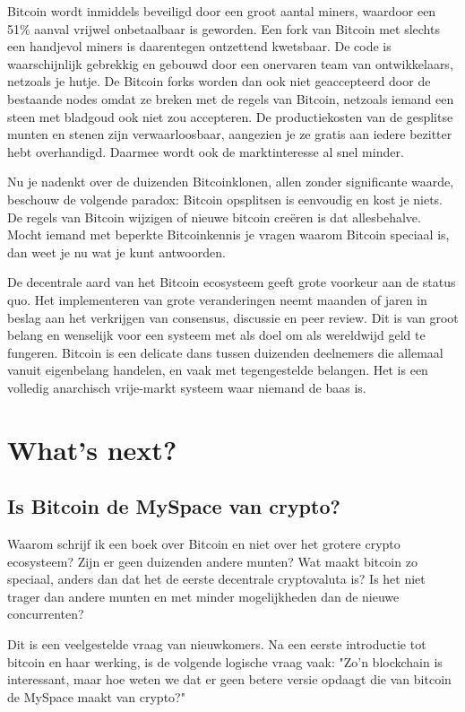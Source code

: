 \documentclass[smalldemyvopaper,11pt,twoside,onecolumn,openright,extrafontsizes]{memoir}
\begin{document}
Bitcoin wordt inmiddels beveiligd door een groot aantal miners, waardoor een 51\% aanval vrijwel onbetaalbaar is geworden. Een fork van Bitcoin met slechts een handjevol miners is daarentegen ontzettend kwetsbaar. De code is waarschijnlijk gebrekkig en gebouwd door een onervaren team van ontwikkelaars, netzoals je hutje. De Bitcoin forks worden dan ook niet geaccepteerd door de bestaande nodes omdat ze breken met de regels van Bitcoin, netzoals iemand een steen met bladgoud ook niet zou accepteren. De productiekosten van de gesplitse munten en stenen zijn verwaarloosbaar, aangezien je ze gratis aan iedere bezitter hebt overhandigd. Daarmee wordt ook de marktinteresse al snel minder.

Nu je nadenkt over de duizenden Bitcoinklonen, allen zonder significante waarde, beschouw de volgende paradox: Bitcoin opsplitsen is eenvoudig en kost je niets. De regels van Bitcoin wijzigen of nieuwe bitcoin creëren is dat allesbehalve. Mocht iemand met beperkte Bitcoinkennis je vragen waarom Bitcoin speciaal is, dan weet je nu wat je kunt antwoorden.

De decentrale aard van het Bitcoin ecosysteem geeft grote voorkeur aan de status quo. Het implementeren van grote veranderingen neemt maanden of jaren in beslag aan het verkrijgen van consensus, discussie en peer review. Dit is van groot belang en wenselijk voor een systeem met als doel om als wereldwijd geld te fungeren. Bitcoin is een delicate dans tussen duizenden deelnemers die allemaal vanuit eigenbelang handelen, en vaak met tegengestelde belangen. Het is een volledig anarchisch vrije-markt systeem waar niemand de baas is. 

\chapter{What's next?}

\section{Is Bitcoin de MySpace van crypto?}

Waarom schrijf ik een boek over Bitcoin en niet over het grotere crypto ecosysteem? Zijn er geen duizenden andere munten? Wat maakt bitcoin zo speciaal, anders dan dat het de eerste decentrale cryptovaluta is? Is het niet trager dan andere munten en met minder mogelijkheden dan de nieuwe concurrenten?

Dit is een veelgestelde vraag van nieuwkomers. Na een eerste introductie tot bitcoin en haar werking, is de volgende logische vraag vaak: "Zo'n blockchain is interessant, maar hoe weten we dat er geen betere versie opdaagt die van bitcoin de MySpace maakt van crypto?"
\end{document}
